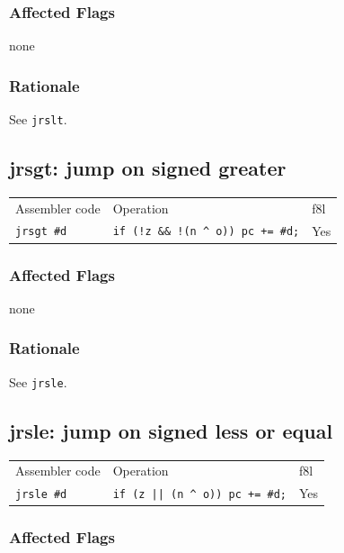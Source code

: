 \documentclass{book}
\begin{document}
\subsubsection*{Affected Flags}

none

\subsubsection*{Rationale}

See \texttt{jrslt}.


\subsection{jrsgt: jump on signed greater}

\begin{tabular}{l l l}
Assembler code     & Operation                                    & f8l \\
\texttt{jrsgt \#d} & \texttt{if (!z \&\& !(n \^{} o)) pc += \#d;} & Yes \\
\end{tabular}

\subsubsection*{Affected Flags}

none

\subsubsection*{Rationale}

See \texttt{jrsle}.


\subsection{jrsle: jump on signed less or equal}

\begin{tabular}{l l l}
Assembler code   & Operation                                  & f8l \\
\texttt{jrsle \#d} & \texttt{if (z || (n \^{} o)) pc += \#d;} & Yes \\
\end{tabular}

\subsubsection*{Affected Flags}
\end{document}
